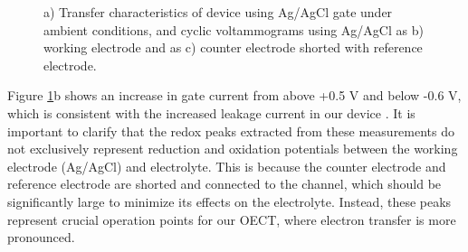\begin{figure}[ht]
    \centering 
    \qquad
    \caption[Transfer characteristics and cyclic voltammograms of device using Ag/AgCl gate under ambient conditions]{a) Transfer characteristics of device using Ag/AgCl gate under ambient conditions, and cyclic voltammograms using Ag/AgCl as b) working electrode and as c) counter electrode shorted with reference electrode.}
    \label{fig:DropAgCl}
\end{figure}

Figure \ref{fig:DropAgCl}b shows an increase in gate current from above +0.5 V and below -0.6 V, which is consistent with the increased leakage current in our device%
. It is important to clarify that the redox peaks extracted from these measurements do not exclusively represent reduction and oxidation potentials between the working electrode (Ag/AgCl) and electrolyte. This is because the counter electrode and reference electrode are shorted and connected to the channel, which should be significantly large to minimize its effects on the electrolyte. Instead, these peaks represent crucial operation points for our OECT, where electron transfer is more pronounced. 

